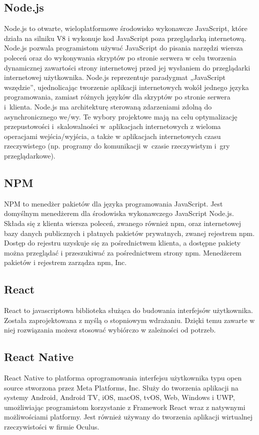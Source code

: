 \documentclass[12pt,a4paper]{article}
\begin{document}
		\subsection{Node.js}
			\indent Node.js to otwarte, wieloplatformowe środowisko wykonawcze JavaScript, które działa na silniku V8 i wykonuje kod JavaScript poza przeglądarką internetową.
			Node.js pozwala programistom używać JavaScript do pisania narzędzi wiersza poleceń oraz do wykonywania skryptów po stronie serwera w celu tworzenia dynamicznej
			zawartości strony internetowej przed jej wysłaniem do przeglądarki internetowej użytkownika. Node.js reprezentuje paradygmat „JavaScript wszędzie”, ujednolicając
			tworzenie aplikacji internetowych wokół jednego języka programowania, zamiast różnych języków dla skryptów po stronie serwera i~klienta.
			Node.js ma architekturę sterowaną zdarzeniami zdolną do asynchronicznego we/wy. Te wybory projektowe mają na celu optymalizację przepustowości i~skalowalności
			w~aplikacjach internetowych z wieloma operacjami wejścia/wyjścia, a także w aplikacjach internetowych czasu rzeczywistego (np. programy do komunikacji w~czasie
			rzeczywistym i~gry przeglądarkowe).
		\subsection{NPM}
			\indent NPM to menedżer pakietów dla języka programowania JavaScript. Jest domyślnym menedżerem dla środowiska wykonawczego JavaScript Node.js. Składa się z klienta
			wiersza poleceń, zwanego również npm, oraz internetowej bazy danych publicznych i płatnych pakietów prywatnych, zwanej rejestrem npm.
			Dostęp do rejestru uzyskuje się za pośrednictwem klienta, a dostępne pakiety można przeglądać i przeszukiwać za pośrednictwem strony npm.
			Menedżerem pakietów i rejestrem zarządza npm, Inc.
		\subsection{React}
			\indent React to javascriptowa biblioteka służąca do budowania interfejsów użytkownika. Została zaprojektowana z myślą o stopniowym wdrażaniu.
			Dzięki temu zawarte w niej rozwiązania możesz stosować wybiórczo w zależności od potrzeb.
		\subsection{React Native}
			\indent React Native to platforma oprogramowania interfejsu użytkownika typu open source stworzona przez Meta Platforms, Inc. Służy do tworzenia aplikacji
			na systemy Android, Android TV, iOS, macOS, tvOS, Web, Windows i UWP, umożliwiając programistom korzystanie z Framework React wraz z natywnymi możliwościami
			platformy. Jest również używany do tworzenia aplikacji wirtualnej rzeczywistości w firmie Oculus.
\end{document}

